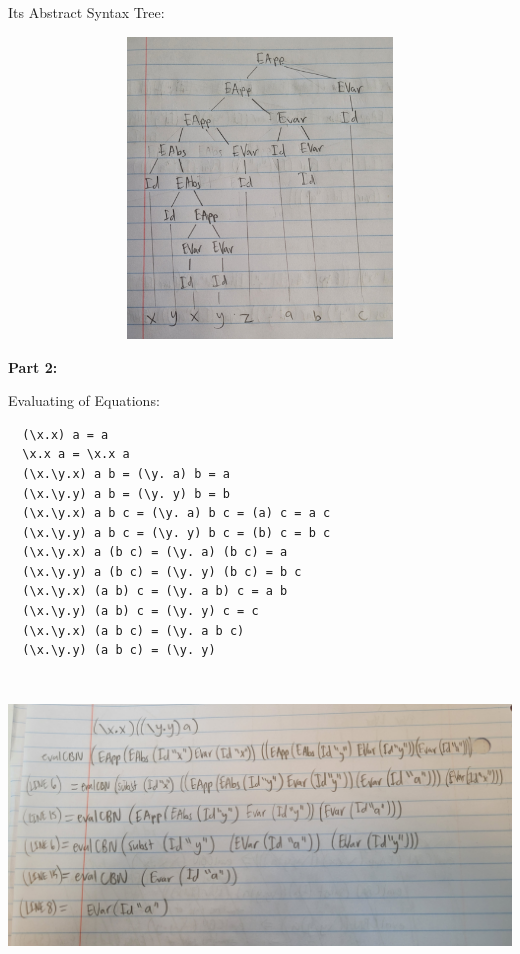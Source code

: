 \documentclass{article}
\theoremstyle{theorem}
\theoremstyle{definition}
\theoremstyle{remark}
\begin{document}
Its Abstract Syntax Tree:

\includegraphics[width=15cm, height=8cm]{Report Images/week5_8.jpg}

\textbf{Part 2:}

Evaluating of Equations:
\begin{lstlisting}
  (\x.x) a = a         
  \x.x a = \x.x a           
  (\x.\y.x) a b = (\y. a) b = a    
  (\x.\y.y) a b = (\y. y) b = b   
  (\x.\y.x) a b c = (\y. a) b c = (a) c = a c 
  (\x.\y.y) a b c = (\y. y) b c = (b) c = b c
  (\x.\y.x) a (b c) = (\y. a) (b c) = a
  (\x.\y.y) a (b c) = (\y. y) (b c) = b c 
  (\x.\y.x) (a b) c = (\y. a b) c = a b 
  (\x.\y.y) (a b) c = (\y. y) c = c
  (\x.\y.x) (a b c) = (\y. a b c)
  (\x.\y.y) (a b c) = (\y. y)
\end{lstlisting}

\includegraphics[width=15cm, height=8cm]{Report Images/week5_9.jpg}
\end{document}
